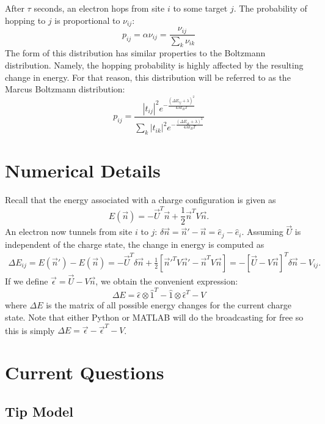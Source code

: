 \documentclass[11pt]{article}
\newcommand{\kt}{k_B T}
\newcommand{\One}{\hat{1}}
\begin{document}
After $\tau$ seconds, an electron hops from site $i$ to some target $j$. The probability of hopping to $j$ is proportional to $\nu_{ij}$:
\begin{equation}
p_{ij} = \alpha \nu_{ij} = \frac{\nu_{ij}}{\sum_k \nu_{ik}}
\end{equation}
The form of this distribution has similar properties to the Boltzmann distribution. Namely, the hopping probability is highly affected by the resulting change in energy. For that reason, this distribution will be referred to as the Marcus Boltzmann distribution:
\[
p_{ij} = \frac{|t_{ij}|^2 e^{-\frac{(\Delta E_{ij}+\lambda)^2}{4\lambda \kt}}}{\sum_k |t_{ik}|^2 e^{-\frac{(\Delta E_{ik}+\lambda)^2}{4\lambda \kt}}}
\]

\section{Numerical Details}

Recall that the energy associated with a charge configuration is given as
\[
E(\vec{n}) = -\vec{U}^T\vec{n} + \frac{1}{2}\vec{n}^T V \vec{n}.
\]
An electron now tunnels from site $i$ to $j$: $\delta \vec{n} = \vec{n}' - \vec{n} = \hat{e}_j - \hat{e}_i$. Assuming $\vec{U}$ is independent of the charge state, the change in energy is computed as
\begin{align*}
\Delta E_{ij} = E(\vec{n}') - E(\vec{n}) = -\vec{U}^T \delta \vec{n}+ \frac{1}{2} \left[\vec{n}'^T V \vec{n}' - \vec{n}^T V \vec{n} \right] = -[\vec{U} - V\vec{n}]^T\delta \vec{n} - V_{ij}.
\end{align*}
If we define $\vec{\epsilon} = \vec{U} - V\vec{n}$, we obtain the convenient expression:
\begin{equation}
\Delta E = \hat{\epsilon} \otimes \One^T - \One \otimes \hat{\epsilon}^T - V
\end{equation}
where $\Delta E$ is the matrix of all possible energy changes for the current charge state. Note that either Python or MATLAB will do the broadcasting for free so this is simply $\Delta E = \vec{\epsilon} - \vec{\epsilon}^T - V$.




\section{Current Questions}

\subsection{Tip Model}
\end{document}
